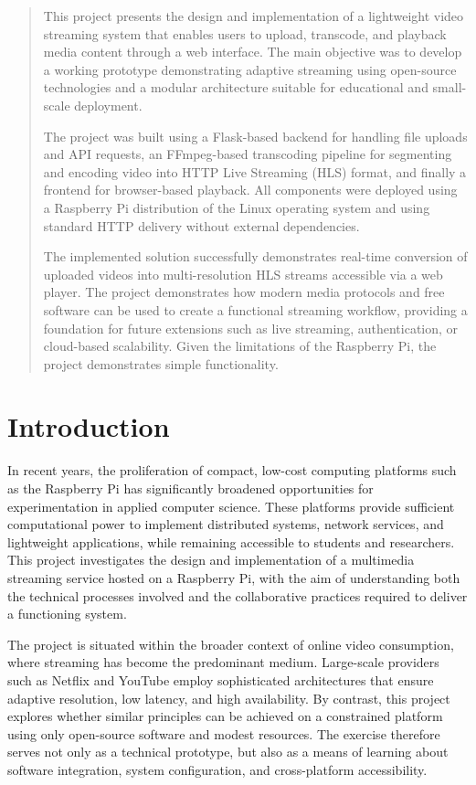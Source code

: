 \documentclass[11pt]{article}
\begin{document}
\begin{abstract}
This project presents the design and implementation of a lightweight video streaming system that enables users to upload, transcode, and playback media content through a web interface. The main objective was to develop a working prototype demonstrating adaptive streaming using open-source technologies and a modular architecture suitable for educational and small-scale deployment. 

The project was built using a Flask-based backend for handling file uploads and API requests, an FFmpeg-based transcoding pipeline for segmenting and encoding video into HTTP Live Streaming (HLS) format, and finally a frontend for browser-based playback. All components were deployed using a Raspberry Pi distribution of the Linux operating system and using standard HTTP delivery without external dependencies. 

The implemented solution successfully demonstrates real-time conversion of uploaded videos into multi-resolution HLS streams accessible via a web player. The project demonstrates how modern media protocols and free software can be used to create a functional streaming workflow, providing a foundation for future extensions such as live streaming, authentication, or cloud-based scalability. Given the limitations of the Raspberry Pi, the project demonstrates simple functionality.
\end{abstract}

\tableofcontents

\section{Introduction}
In recent years, the proliferation of compact, low-cost computing platforms such as the Raspberry Pi has significantly broadened opportunities for experimentation in applied computer science. These platforms provide sufficient computational power to implement distributed systems, network services, and lightweight applications, while remaining accessible to students and researchers. This project investigates the design and implementation of a multimedia streaming service hosted on a Raspberry Pi, with the aim of understanding both the technical processes involved and the collaborative practices required to deliver a functioning system.

The project is situated within the broader context of online video consumption, where streaming has become the predominant medium. Large-scale providers such as Netflix and YouTube employ sophisticated architectures that ensure adaptive resolution, low latency, and high availability. By contrast, this project explores whether similar principles can be achieved on a constrained platform using only open-source software and modest resources. The exercise therefore serves not only as a technical prototype, but also as a means of learning about software integration, system configuration, and cross-platform accessibility.
\end{document}

